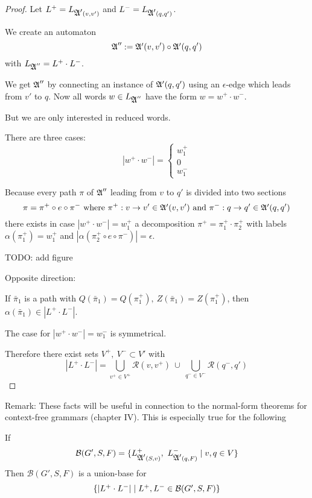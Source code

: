 \begin{proof}
Let $L^+ = L_{\mbox{$\mathfrak{A'}$}(v, v')}$ and $L^- = L_{\mbox{$\mathfrak{A'}$}(q, q')}$. 

We create an automaton
\[ \mbox{$\mathfrak{A}$}'' := \mbox{$\mathfrak{A'}$}(v, v') \circ \mbox{$\mathfrak{A'}$}(q, q') \]
with $L_{\mbox{$\mathfrak{A}$}''} = L^+ \cdot L^-$.

We get $\mbox{$\mathfrak{A}$}''$ by connecting an instance of $\mbox{$\mathfrak{A'}$}(q, q')$ using an
$\epsilon$-edge which leads from $v'$ to $q$. Now all words $w \in L_{\mbox{$\mathfrak{A}$}''}$
have the form $w = w^+ \cdot w^-$. 

But we are only interested in reduced words.

There are three cases:
\[ |w^+ \cdot w^-| = \begin{cases} w_1^+ \\ 0 \\ w_1^- \end{cases} \]

Because every path $\pi$ of $\mbox{$\mathfrak{A}$}''$ leading from $v$ to $q'$ is divided into
two sections
\[ \pi = \pi^+ \circ e \circ \pi^- \text{ where }\pi^+: v \to v' \in \mbox{$\mathfrak{A'}$}(v,
v')\text{ and }\pi^-: q \to q' \in \mbox{$\mathfrak{A'}$}(q, q') \]
there exists in case $|w^+ \cdot w^-| = w_1^+$ a decomposition $\pi^+ = \pi_1^+
\cdot \pi_2^+$ with labels $\alpha(\pi_1^+) = w_1^+$ and $|\alpha(\pi_2^+ \circ
e \circ \pi^-)| = \epsilon$.

TODO: add figure

\bigskip
Opposite direction:

If $\bar{\pi}_1$ is a path with $Q(\bar{\pi}_1) = Q(\pi_1^+),\ Z(\bar{\pi}_1) =
Z(\pi_1^+)$, then $\alpha(\bar{\pi}_1) \in |L^+ \cdot L^-|$.

\medskip
The case for $|w^+ \cdot w^-| = w_1^-$ is symmetrical.

\bigskip
Therefore there exist sets $V^+,\ V^- \subset V'$ with
\[ |L^+ \cdot L^-| = \bigcup_{v^+ \in V^+} \mathcal{R}(v, v^+) \ \cup\ 
\bigcup_{q^- \in V^-} \mathcal{R}(q^-, q') \]
\end{proof}

Remark: These facts will be useful in connection to the normal-form
theorems for context-free grammars (chapter IV). This is especially true for the
following

\begin{corollary}
If 
\[ \mathcal{B}(G', S, F) = \mbox{$\{L^+_{\mbox{$\mathfrak{A'}$}(S, v)},\ L^-_{\mbox{$\mathfrak{A'}$}(q, F)}
\mid v, q \in V\}$} \]
Then $\mathcal{B}(G', S, F)$ is a union-base for
\[ \mbox{$\{|L^+ \cdot L^-| \mid L^+, L^- \in \mathcal{B}(G', S, F)\}$} \]
\end{corollary}

